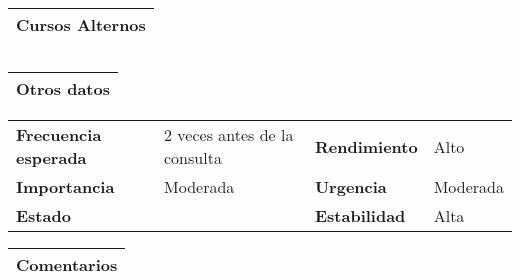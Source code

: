\documentclass[11pt,a4paper]{article}
\begin{document}
\begin{table}[H]
	\begin{tabularx}{\textwidth}{X}
		\textbf{Cursos Alternos}\\ \hline
	\end{tabularx}
	\begin{tabularx}{\textwidth}{cX}
	\end{tabularx}
	\begin{tabularx}{\textwidth}{X}
		\textbf{Otros datos}\\ \hline
	\end{tabularx}
	\begin{tabularx}{\textwidth}{lXlX}
		\textbf{Frecuencia esperada} & 2 veces antes de la consulta & \textbf{Rendimiento} & Alto\\
		\textbf{Importancia} & Moderada & \textbf{Urgencia} & Moderada\\
		\textbf{Estado} &  & \textbf{Estabilidad} & Alta \\
	\end{tabularx}
	\begin{tabularx}{\textwidth}{X}
		\textbf{Comentarios}\\ \hline
	\end{tabularx}
\end{table}


\end{document}
